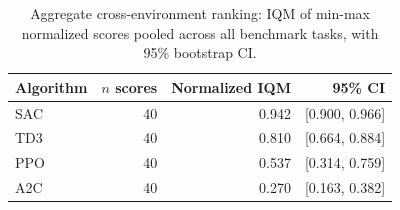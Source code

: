 \begin{table}[t]
\centering
\caption{Aggregate cross-environment ranking: IQM of min-max normalized scores pooled across all benchmark tasks, with 95\% bootstrap CI.}
\label{tab:aggregate}
\begin{tabular}{lrrr}
\toprule
Algorithm & $n$ scores & Normalized IQM & 95\% CI \\
\midrule
SAC & 40 & 0.942 & [0.900, 0.966] \\
TD3 & 40 & 0.810 & [0.664, 0.884] \\
PPO & 40 & 0.537 & [0.314, 0.759] \\
A2C & 40 & 0.270 & [0.163, 0.382] \\
\bottomrule
\end{tabular}
\end{table}
